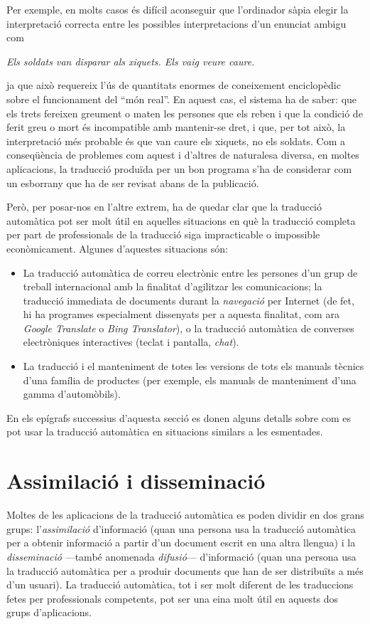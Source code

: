 Per exemple, en molts casos és difícil aconseguir que l'ordinador
sàpia elegir la interpretació correcta  entre les possibles
interpretacions 
d'un enunciat ambigu com 
\begin{center}
\emph{Els soldats van disparar als xiquets. Els vaig veure caure.}
\end{center} 
ja que això requereix l'ús de quantitats enormes de coneixement
enciclopèdic sobre el funcionament del ``món real''. En aquest cas, el
sistema ha de saber: que els trets fereixen greument o maten les
persones que els reben i que la condició de ferit greu o mort és
incompatible amb mantenir-se dret, i que, per tot això, la
interpretació més probable és que van caure els xiquets, no els
soldats. Com a conseqüència de problemes com aquest i d'altres de
naturalesa diversa, en moltes aplicacions, la traducció produïda per
un bon programa s'ha de considerar com un esborrany que ha de ser
revisat abans de la publicació.


Però, per posar-nos en l'altre extrem, ha de quedar clar que la
traducció automàtica pot ser molt útil en aquelles situacions en què
la traducció completa per part de professionals de la traducció siga
impracticable o impossible econòmicament. Algunes d'aquestes
situacions són:
\begin{itemize}
\item La traducció automàtica de correu electrònic entre les persones
  d'un grup de treball internacional amb la finalitat d'agilitzar les
  comunicacions; la traducció immediata de documents durant la
  \emph{navegació} per Internet (de fet, hi ha programes especialment
  dissenyats per a aquesta finalitat, com ara \emph{Google Translate}
  o \emph{Bing Translator}), o la traducció automàtica de converses
  electròniques interactives (teclat i pantalla, \emph{chat}).
\item La traducció i el manteniment de totes les versions de tots els
  manuals tècnics d'una família de productes (per exemple, els manuals
  de manteniment d'una gamma d'automòbils).
\end{itemize}
En els epígrafs successius d'aquesta secció es donen alguns detalls sobre
com es pot usar la traducció automàtica en situacions
similars a les esmentades.

\section{Assimilació i disseminació} 

Moltes de les aplicacions de la traducció automàtica es poden dividir
en dos grans grups: l'\emph{assimilació} d'informació (quan una
persona usa la traducció automàtica per a obtenir informació a partir
d'un document escrit en una altra llengua) i la \emph{disseminació}
---també anomenada \emph{difusió}--- d'informació (quan una persona
usa la traducció automàtica per a produir documents que han de ser
distribuïts a més d'un usuari).  La traducció automàtica, tot i ser
molt diferent de les traduccions fetes per professionals competents,
pot ser una eina molt útil en aquests dos grups d'aplicacions.

